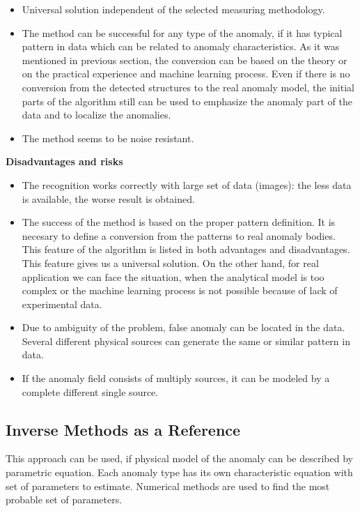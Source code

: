 \documentclass[FM]{tulthesis}
\begin{document}
\begin{itemize}

\item Universal solution independent of the selected measuring methodology.

\item The method can be successful for any type of the anomaly, if it has typical pattern in data which can be related to anomaly characteristics. As it was mentioned in previous section, the conversion can be based on the theory or on the practical experience and machine learning process. Even if there is no conversion from the detected structures to the real anomaly model, the initial parts of the algorithm still can be used to emphasize the anomaly part of the data and to localize the anomalies.

\item The method seems to be noise resistant.

\end{itemize}

\textbf{Disadvantages and risks}

\begin{itemize}

\item The recognition works correctly with large set of data (images): the less data is available, the worse result is obtained. 	

\item The success of the method is based on the proper pattern definition. It is necesary to define a conversion from the patterns to real anomaly bodies. This feature of the algorithm is listed in both advantages and disadvantages. This feature gives us a universal solution. On the other hand, for real application we can face the situation, when the analytical model is too complex or the machine learning process is not possible because of lack of experimental data.

\item Due to ambiguity of the problem, false anomaly can be located in the data. Several different physical sources can generate the same or similar pattern in data. 

\item If the anomaly field consists of multiply sources, it can be modeled by a complete different single source.

\end{itemize}


\subsection{Inverse Methods as a Reference}
This approach can be used, if physical model of the anomaly can be described by parametric equation. Each anomaly type has its own characteristic equation with set of parameters to estimate. Numerical methods are used to find the most probable set of parameters. 
\end{document}

